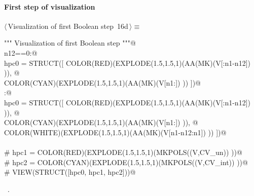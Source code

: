 \documentclass[11pt,oneside]{article}	%
\begin{document}
\paragraph{First step of visualization}

\begin{flushleft} \small \label{scrap35}
\protect{}$\langle\,$Visualization of first Boolean step\nobreak\ {\footnotesize 16d}$\,\rangle\equiv$
\vspace{-1ex}
\begin{list}{}{} \item
\mbox{}\verb@""" Visualization of first Boolean step  """@\\
\mbox{}\verb@if n12==0:@\\
\mbox{}\verb@   hpc0 = STRUCT([ COLOR(RED)(EXPLODE(1.5,1.5,1)(AA(MK)(V[:n1-n12]) )), @\\
\mbox{}\verb@            COLOR(CYAN)(EXPLODE(1.5,1.5,1)(AA(MK)(V[n1:]) )) ])@\\
\mbox{}\verb@else:@\\
\mbox{}\verb@   hpc0 = STRUCT([ COLOR(RED)(EXPLODE(1.5,1.5,1)(AA(MK)(V[:n1-n12]) )), @\\
\mbox{}\verb@            COLOR(CYAN)(EXPLODE(1.5,1.5,1)(AA(MK)(V[n1:]) )), @\\
\mbox{}\verb@            COLOR(WHITE)(EXPLODE(1.5,1.5,1)(AA(MK)(V[n1-n12:n1]) )) ])@\\
\mbox{}\verb@@\\
\mbox{}\verb@# hpc1 = COLOR(RED)(EXPLODE(1.5,1.5,1)(MKPOLS((V,CV_un)) ))@\\
\mbox{}\verb@# hpc2 = COLOR(CYAN)(EXPLODE(1.5,1.5,1)(MKPOLS((V,CV_int)) ))@\\
\mbox{}\verb@# VIEW(STRUCT([hpc0, hpc1, hpc2]))@\\
\mbox{}\verb@@{\NWsep}
\end{list}
\vspace{-1ex}
\footnotesize\addtolength{\baselineskip}{-1ex}
\begin{list}{}{\setlength{\itemsep}{-\parsep}\setlength{\itemindent}{-\leftmargin}}
\item \NWtxtMacroRefIn\ .
\end{list}
\end{flushleft}
\end{document}
